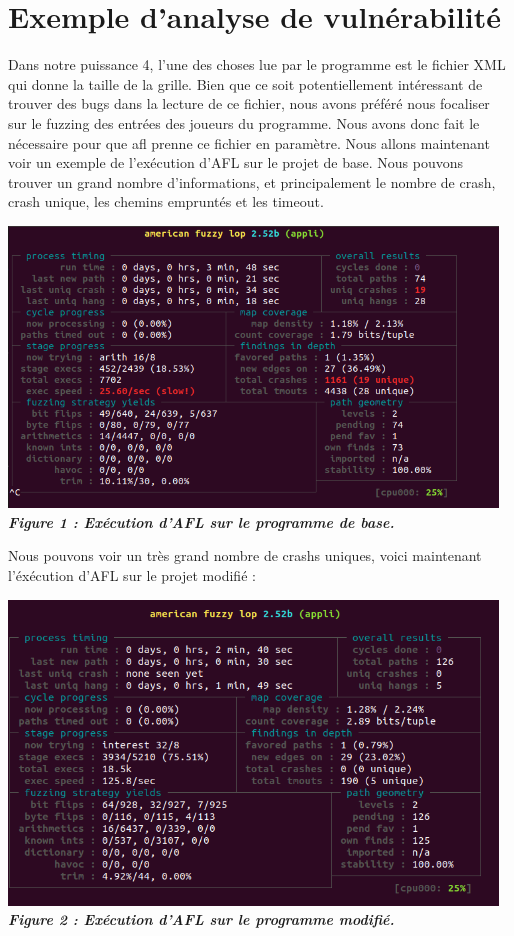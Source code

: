 \documentclass{report}
\begin{document}
\section{Exemple d'analyse de vulnérabilité}
Dans notre puissance 4, l'une des choses lue par le programme est le fichier XML qui donne la taille de la grille.
Bien que ce soit potentiellement intéressant de trouver des bugs dans la lecture de ce fichier, nous avons préféré nous focaliser sur le fuzzing des entrées des joueurs du programme.
Nous avons donc fait le nécessaire pour que afl prenne ce fichier en paramètre.
Nous allons maintenant voir un exemple de l'exécution d'AFL sur le projet de base.
Nous pouvons trouver un grand nombre d'informations, et principalement le nombre de crash, crash unique, les chemins empruntés et les timeout.

\begin{center}
  \includegraphics[width=13cm]{captureafl1.png}
\textbf{\textit{Figure 1 : Exécution d'AFL sur le programme de base.}}
\end{center}

Nous pouvons voir un très grand nombre de crashs uniques, voici maintenant l'éxécution d'AFL sur le projet modifié : 

\begin{center}
  \includegraphics[width=13cm]{captureafl2.png}
\textbf{\textit{Figure 2 : Exécution d'AFL sur le programme modifié.}}
\end{center}
\end{document}
